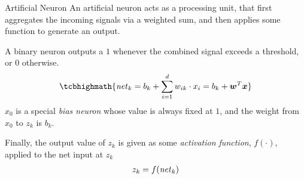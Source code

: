 %
\begin{frame}{Artificial Neuron}
An artificial neuron acts as a processing unit, that first aggregates the
incoming signals via a weighted sum, and then applies some function to
generate an output. 

\medskip

A binary neuron outputs a $1$ whenever
the combined signal exceeds a threshold, or $0$ otherwise.
%
\begin{align*}
    \tcbhighmath{
    \net_k = b_k + \sum^{d}_{i=1} w_{ik} \cdot x_i = b_k +
\bw^T\bx}
\end{align*}
$x_0$ is a
special {\em bias neuron} whose value is always fixed at $1$, and the
weight from $x_0$ to $z_k$ is $b_k$.

	\medskip

	Finally, the output value of $z_k$ is given as some {\em
    activation function}, $f(\cdot)$, applied to the net input at $z_k$
\begin{align*}
    z_k = f(\mathit{net}_k)
\end{align*}
\end{frame}
%
%
